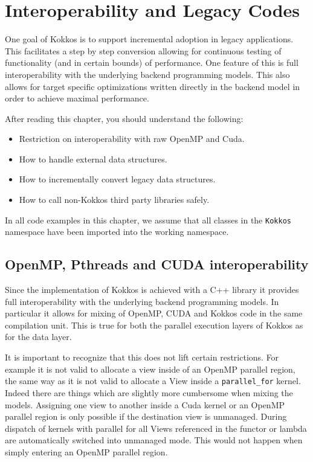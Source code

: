 \chapter{Interoperability and Legacy Codes}

One goal of Kokkos is to support incremental adoption in legacy 
applications. This facilitates a step by step conversion allowing
for continuous testing of functionality (and in certain bounds) of 
performance. One feature of this is full interoperability with the 
underlying backend programming models. This also allows for 
target specific optimizations written directly in the backend model
in order to achieve maximal performance.

After reading this chapter, you should understand the following:
\begin{itemize}
\item Restriction on interoperability with raw OpenMP and Cuda.
\item How to handle external data structures.
\item How to incrementally convert legacy data structures.
\item How to call non-Kokkos third party libraries safely.
\end{itemize}
In all code examples in this chapter, we assume that all classes in
the \lstinline!Kokkos! namespace have been imported into the working
namespace.

\section{OpenMP, Pthreads and CUDA interoperability}

Since the implementation of Kokkos is achieved with a C++ library
it provides full interoperability with the underlying backend programming
models. In particular it allows for mixing of OpenMP, CUDA and Kokkos 
code in the same compilation unit. This is true for both the parallel 
execution layers of Kokkos as for the data layer. 

It is important to recognize that this does not lift certain restrictions. 
For example it is not valid to allocate a view inside of an OpenMP 
parallel region, the same way as it is not valid to allocate a View 
inside a \lstinline|parallel_for| kernel. Indeed there are things which 
are slightly more cumbersome when mixing the models. Assigning 
one view to another inside a Cuda kernel or an OpenMP parallel 
region is only possible if the destination view is unmanaged. 
During dispatch of kernels with parallel for  all Views referenced 
in the functor or lambda are automatically switched into unmanaged 
mode. This would not happen when simply entering an OpenMP 
parallel region. 

